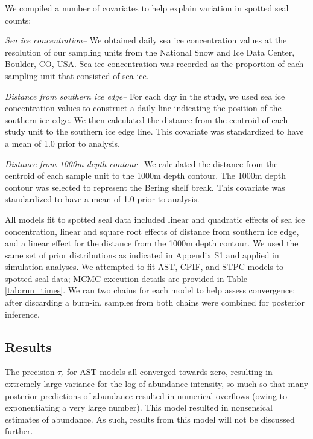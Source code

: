 \documentclass[12pt,fleqn]{article}
\begin{document}
\begin{flushleft}
\hspace{.5in}We compiled a number of covariates to help explain variation in spotted seal counts:

{\it Sea ice concentration--}  We obtained daily sea ice concentration values at the resolution of our sampling units from the National Snow and Ice Data Center, Boulder, CO, USA.  Sea ice concentration was recorded as the proportion of each sampling unit that consisted of sea ice.
    
{\it Distance from southern ice edge--}  For each day in the study, we used sea ice concentration values to construct a daily line indicating the position of the southern ice edge.  We then calculated the distance from the centroid of each study unit to the southern ice edge line.  This covariate was standardized to have a mean of 1.0 prior to analysis.

{\it Distance from 1000m depth contour--}  We calculated the distance from the centroid of each sample unit to the 1000m depth contour.  The 1000m depth contour was selected to represent the Bering shelf break.  This covariate was standardized to have a mean of 1.0 prior to analysis.

\hspace{.5in}All models fit to spotted seal data included linear and quadratic effects of sea ice concentration, linear and square root effects of distance from southern ice edge, and a linear effect for the distance from the 1000m depth contour.  We used the same set of prior distributions as indicated in Appendix S1 and applied in simulation analyses.  We attempted to fit AST, CPIF, and STPC models to spotted seal data; MCMC execution details are provided in Table \ref{tab:run_times}.  We ran two chains for each model to help assess convergence; after discarding a burn-in, samples from both chains were combined for posterior inference.


\subsection{Results}

The precision $\tau_\epsilon$ for AST models all converged towards zero, resulting in extremely large variance for the log of abundance intensity, so much so that many posterior predictions of abundance resulted in numerical overflows (owing to exponentiating a very large number).  This model resulted in nonsensical estimates of abundance.  As such, results from this model will not be discussed further.


\end{flushleft}
\end{document}
